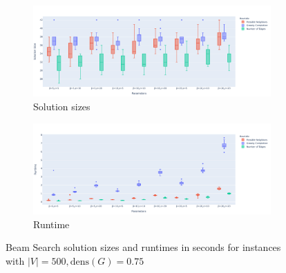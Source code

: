 \documentclass[draft,final]{vutinfth} %
\begin{document}
\begin{figure}
    \centering
    \begin{subfigure}{\textwidth}
        \centering
        \includegraphics[width=\textwidth]{graphics/lbh-075-500-size.pdf}
        \caption{Solution sizes}
    \end{subfigure}
    \begin{subfigure}{\textwidth}
        \centering
        \includegraphics[width=\textwidth]{graphics/lbh-075-500-runtime.pdf}
        \caption{Runtime}
    \end{subfigure}
    \caption{Beam Search solution sizes and runtimes in seconds for instances with $|V|=500, \mathrm{dens}(G)=0.75$}
    \label{fig:bs-heuristics-random-1}
\end{figure}
\end{document}
